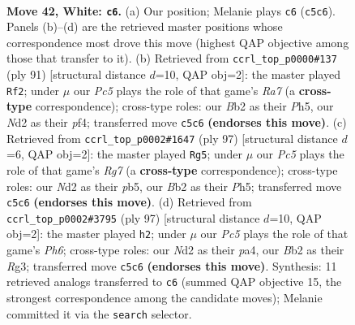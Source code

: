 \documentclass[11pt]{article}
\begin{document}
\clearpage

\begin{figure}[p]\centering
\begin{subfigure}{0.46\textwidth}\centering
\resizebox{\linewidth}{!}{%
\newchessgame
\chessboard[
  setfen={5kr1/8/8/2P5/7K/8/1B1N4/8 w - - 1 42},
  showmover=false,
  pgfstyle=straightmove, color=movearrow, markmove={c5-c6}
]}
\caption{}
\end{subfigure}\hfill
\begin{subfigure}{0.46\textwidth}\centering
\resizebox{\linewidth}{!}{%
\newchessgame
\chessboard[
  setfen={8/8/5k2/7p/5P2/6RK/r7/8 b - - 9 46},
  showmover=false,
  pgfstyle=straightmove, color=movearrow, markmove={a2-f2}
]}
\caption{}
\end{subfigure}
\\[4pt]
\begin{subfigure}{0.46\textwidth}\centering
\resizebox{\linewidth}{!}{%
\newchessgame
\chessboard[
  setfen={8/5k2/8/1P5p/3KR3/8/6r1/8 b - - 0 49},
  showmover=false,
  pgfstyle=straightmove, color=movearrow, markmove={g2-g5}
]}
\caption{}
\end{subfigure}\hfill
\begin{subfigure}{0.46\textwidth}\centering
\resizebox{\linewidth}{!}{%
\newchessgame
\chessboard[
  setfen={8/8/7k/8/P7/6rp/1K6/1R6 b - - 0 49},
  showmover=false,
  pgfstyle=straightmove, color=movearrow, markmove={h3-h2}
]}
\caption{}
\end{subfigure}
\caption{\textbf{Move 42, White: \texttt{c6}.} (a) Our position; Melanie plays \texttt{c6} (\texttt{c5c6}). Panels (b)--(d) are the retrieved master positions whose correspondence most drove this move (highest QAP objective among those that transfer to it). (b) Retrieved from \texttt{ccrl\_top\_p0000\#137} (ply 91) [structural distance $d$=10, QAP obj=2]: the master played \texttt{Rf2}; under $\mu$ our \emph{Pc5} plays the role of that game's \emph{Ra7} (a \textbf{cross-type} correspondence); cross-type roles: our \emph{B}b2 as their \emph{P}h5, our \emph{N}d2 as their \emph{p}f4; transferred move \texttt{c5c6} \textbf{(endorses this move)}. (c) Retrieved from \texttt{ccrl\_top\_p0002\#1647} (ply 97) [structural distance $d$=6, QAP obj=2]: the master played \texttt{Rg5}; under $\mu$ our \emph{Pc5} plays the role of that game's \emph{Rg7} (a \textbf{cross-type} correspondence); cross-type roles: our \emph{N}d2 as their \emph{p}b5, our \emph{B}b2 as their \emph{P}h5; transferred move \texttt{c5c6} \textbf{(endorses this move)}. (d) Retrieved from \texttt{ccrl\_top\_p0002\#3795} (ply 97) [structural distance $d$=10, QAP obj=2]: the master played \texttt{h2}; under $\mu$ our \emph{Pc5} plays the role of that game's \emph{Ph6}; cross-type roles: our \emph{N}d2 as their \emph{p}a4, our \emph{B}b2 as their \emph{R}g3; transferred move \texttt{c5c6} \textbf{(endorses this move)}. Synthesis: 11 retrieved analogs transferred to \texttt{c6} (summed QAP objective 15, the strongest correspondence among the candidate moves); Melanie committed it via the \texttt{search} selector.}
\label{fig:thought-m82}
\end{figure}
\end{document}
